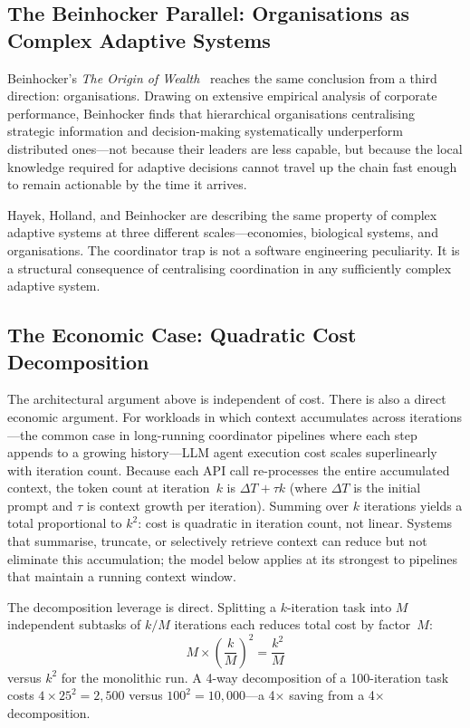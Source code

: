 \documentclass[11pt]{article}
\begin{document}
\subsection{The Beinhocker Parallel: Organisations as Complex Adaptive Systems}

Beinhocker's \emph{The Origin of Wealth}~\cite{beinhocker} reaches the same
conclusion from a third direction: organisations. Drawing on extensive empirical
analysis of corporate performance, Beinhocker finds that hierarchical organisations
centralising strategic information and decision-making systematically underperform
distributed ones---not because their leaders are less capable, but because the
local knowledge required for adaptive decisions cannot travel up the chain fast
enough to remain actionable by the time it arrives.

Hayek, Holland, and Beinhocker are describing the same property of complex
adaptive systems at three different scales---economies, biological systems, and
organisations. The coordinator trap is not a software engineering peculiarity. It
is a structural consequence of centralising coordination in any sufficiently
complex adaptive system.

\subsection{The Economic Case: Quadratic Cost Decomposition}

The architectural argument above is independent of cost. There is also a direct
economic argument. For workloads in which context accumulates across
iterations---the common case
in long-running coordinator pipelines where each step appends to a growing
history---LLM agent execution cost scales superlinearly with iteration count.
Because each API call re-processes the entire accumulated context, the token
count at iteration~$k$ is $\Delta T + \tau k$ (where $\Delta T$ is the initial
prompt and $\tau$ is context growth per iteration). Summing over $k$ iterations
yields a total proportional to $k^2$: cost is quadratic in iteration count, not
linear. Systems that summarise, truncate, or selectively retrieve context can
reduce but not eliminate this accumulation; the model below applies at its
strongest to pipelines that maintain a running context window.

The decomposition leverage is direct. Splitting a $k$-iteration task into $M$
independent subtasks of $k/M$ iterations each reduces total cost by factor~$M$:
\[
  M \times \left(\frac{k}{M}\right)^2 = \frac{k^2}{M}
\]
versus $k^2$ for the monolithic run. A 4-way decomposition of a 100-iteration task
costs $4 \times 25^2 = 2{,}500$ versus $100^2 = 10{,}000$---a 4$\times$ saving
from a 4$\times$ decomposition.
\end{document}
